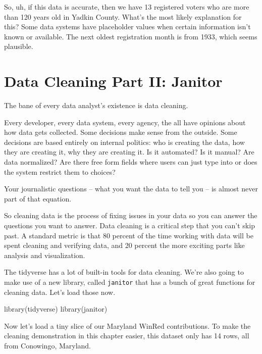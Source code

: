 \documentclass[
  letterpaper,
  DIV=11,
  numbers=noendperiod]{scrreprt}
\newenvironment{Shaded}{\begin{snugshade}}{\end{snugshade}}
\newcommand{\FunctionTok}[1]{\textcolor[rgb]{0.28,0.35,0.67}{#1}}
\newcommand{\NormalTok}[1]{\textcolor[rgb]{0.00,0.23,0.31}{#1}}
\begin{document}
So, uh, if this data is accurate, then we have 13 registered voters who
are more than 120 years old in Yadkin County. What's the most likely
explanation for this? Some data systems have placeholder values when
certain information isn't known or available. The next oldest
registration month is from 1933, which seems plausible.


\hypertarget{data-cleaning-part-ii-janitor}{%
\chapter{Data Cleaning Part II:
Janitor}\label{data-cleaning-part-ii-janitor}}

The bane of every data analyst's existence is data cleaning.

Every developer, every data system, every agency, the all have opinions
about how data gets collected. Some decisions make sense from the
outside. Some decisions are based entirely on internal politics: who is
creating the data, how they are creating it, why they are creating it.
Is it automated? Is it manual? Are data normalized? Are there free form
fields where users can just type into or does the system restrict them
to choices?

Your journalistic questions -- what you want the data to tell you -- is
almost never part of that equation.

So cleaning data is the process of fixing issues in your data so you can
answer the questions you want to answer. Data cleaning is a critical
step that you can't skip past. A standard metric is that 80 percent of
the time working with data will be spent cleaning and verifying data,
and 20 percent the more exciting parts like analysis and visualization.

The tidyverse has a lot of built-in tools for data cleaning. We're also
going to make use of a new library, called \texttt{janitor} that has a
bunch of great functions for cleaning data. Let's load those now.

\begin{Shaded}
\begin{Highlighting}[]
\FunctionTok{library}\NormalTok{(tidyverse)}
\FunctionTok{library}\NormalTok{(janitor)}
\end{Highlighting}
\end{Shaded}

Now let's load a tiny slice of our Maryland WinRed contributions. To
make the cleaning demonstration in this chapter easier, this dataset
only has 14 rows, all from Conowingo, Maryland.
\end{document}
